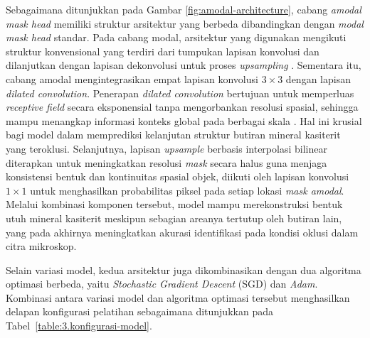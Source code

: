 Sebagaimana ditunjukkan pada Gambar \ref{fig:amodal-architecture}, cabang \textit{amodal mask head} memiliki struktur arsitektur yang berbeda dibandingkan dengan \textit{modal mask head} standar. Pada cabang modal, arsitektur yang digunakan mengikuti struktur konvensional yang terdiri dari tumpukan lapisan konvolusi dan dilanjutkan dengan lapisan dekonvolusi untuk proses \textit{upsampling} \cite{MaskRcnnIEEE11}. Sementara itu, cabang amodal mengintegrasikan empat lapisan konvolusi $3 \times 3$ dengan lapisan \textit{dilated convolution}. Penerapan \textit{dilated convolution} bertujuan untuk memperluas \textit{receptive field} secara eksponensial tanpa mengorbankan resolusi spasial, sehingga mampu menangkap informasi konteks global pada berbagai skala \cite{dilatedConv}. Hal ini krusial bagi model dalam memprediksi kelanjutan struktur butiran mineral kasiterit yang teroklusi. Selanjutnya, lapisan \textit{upsample} berbasis interpolasi bilinear diterapkan untuk meningkatkan resolusi \textit{mask} secara halus guna menjaga konsistensi bentuk dan kontinuitas spasial objek, diikuti oleh lapisan konvolusi $1 \times 1$ untuk menghasilkan probabilitas piksel pada setiap lokasi \textit{mask amodal}. Melalui kombinasi komponen tersebut, model mampu merekonstruksi bentuk utuh mineral kasiterit meskipun sebagian areanya tertutup oleh butiran lain, yang pada akhirnya meningkatkan akurasi identifikasi pada kondisi oklusi dalam citra mikroskop. \par

Selain variasi model, kedua arsitektur juga dikombinasikan dengan dua algoritma optimasi berbeda, yaitu \textit{Stochastic Gradient Descent} (SGD) dan \textit{Adam}. Kombinasi antara variasi model dan algoritma optimasi tersebut menghasilkan delapan konfigurasi pelatihan sebagaimana ditunjukkan pada Tabel~\ref{table:3.konfigurasi-model}.
 
